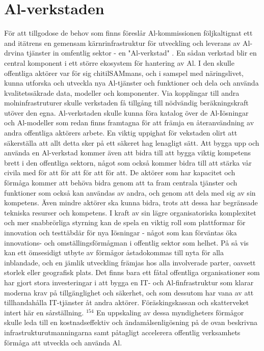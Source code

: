 \section*{Al-verkstaden}
För att tillgodose de behov som finns föreslår Al-kommissionen följkaltignat ett and itätrens en gemensam kärnrinfrastruktur för utveckling och leverans av Al-drvina tjänster in omfentlig sektor - en "Al-verkstad" . En sådan verkstad blir en central komponent i ett större ekosystem för hantering av Al. I den skulle offentliga aktörer var för sig chitilSAMmans, och i samspel med näringslivet, kunna utforska och utveckla nya Al-tjänster och funktioner och dela och använda kvalitetssäkrade data, modeller och komponenter. Via kopplingar till andra molninfrastruturer skulle verkstaden få tillgång till nödvändig beräkningskraft utöver den egna. Al-verkstaden skulle kunna föra katalog över de Al-Iösningar och Al-modeller som redan finns framtagna för att främja en återanvändning av andra offentliga aktörers arbete. En viktig uppighat för vekstaden olirt att säkerställa att allt detta sker på ett säkeret hag lenagligt sätt. Att bygga upp och använda en Al-verkstad kommer även att bidra till att bygga viktig kompetens brett i den offentliga sektorn, något som också kommer bidra till att stärka vår civila med för att för att för att för att.
De aktörer som har kapacitet och förmåga kommer att behöva bidra genom att ta fram centrala tjänster och funktioner som också kan användas av andra, och genom att dela med sig av sin kompetens. Även mindre aktörer ska kunna bidra, trots att dessa har begränsade tekniska resurser och kompetens. I kraft av sin lägre organisatoriska komplexitet och mer snabbrörliga styrning kan de spela en viktig roll som plattformar för innovation och testtäbdär för nya Iösningar - något som kan förväntas öka innovations- och omställingsförmågman i offentlig sektor som helhet. På så vis kan ett ömsesidigt utbyte av förmågor åstadokommas till nyta för alla inblandade, och en jämlik utveckling främjas hos alla involverade parter, oavsett storlek eller geografisk plats.
Det finns bara ett fåtal offentliga organisationer som har gjort stora investeringar i att bygga en IT- och Al-finfrastruktur som klarar moderna krav på tillgänglighet och säkerhet, och som dessutom har vana av att tillhandahålla IT-tjänster åt andra aktörer. Föräskingskassan och skatterveket intert här en sårställning. \({ }^{154}\) En uppskaling av dessa myndigheters förmågor skulle leda till en kostnadseffektiv och ändamålsenligösning på de ovan beskrivna infrastrukturutmanningarna samt påtagligt accelerera offentlig verksamhets förmåga att utveckla och använda Al.

